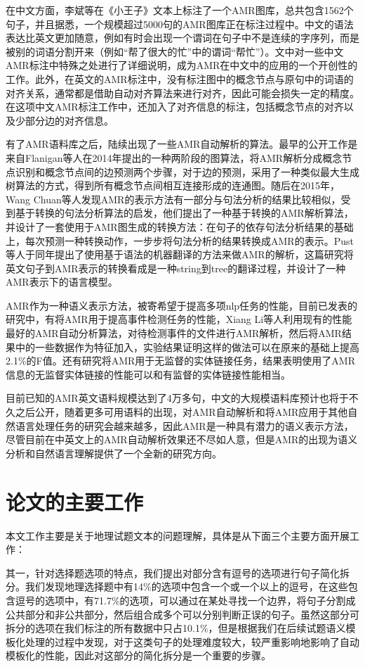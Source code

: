 \documentclass[master, winfont]{njuthesis}
\begin{document}
在中文方面，李斌等\cite{Li2016Annotating}在《小王子》文本上标注了一个AMR图库，总共包含1562个句子，并且据悉，一个规模超过5000句的AMR图库正在标注过程中。中文的语法表达比英文更加随意，例如有时会出现一个谓词在句子中不是连续的字序列，而是被别的词语分割开来（例如“帮了很大的忙”中的谓词“帮忙”）。文中对一些中文AMR标注中特殊之处进行了详细说明，成为AMR在中文中的应用的一个开创性的工作。此外，在英文的AMR标注中，没有标注图中的概念节点与原句中的词语的对齐关系，通常都是借助自动对齐算法来进行对齐，因此可能会损失一定的精度。在这项中文AMR标注工作中，还加入了对齐信息的标注，包括概念节点的对齐以及少部分边的对齐信息。

有了AMR语料库之后，陆续出现了一些AMR自动解析的算法。最早的公开工作是来自Flanigan等人\cite{Flanigan2014}在2014年提出的一种两阶段的图算法，将AMR解析分成概念节点识别和概念节点间的边预测两个步骤，对于边的预测，采用了一种类似最大生成树算法的方式，得到所有概念节点间相互连接形成的连通图。随后在2015年，Wang Chuan\cite{Wang2015}等人发现AMR的表示方法有一部分与句法分析的结果比较相似，受到基于转换的句法分析算法的启发，他们提出了一种基于转换的AMR解析算法，并设计了一套使用于AMR图生成的转换方法：在句子的依存句法分析结果的基础上，每次预测一种转换动作，一步步将句法分析的结果转换成AMR的表示。Pust等人\cite{Pust2015}于同年提出了使用基于语法的机器翻译的方法来做AMR的解析，这篇研究将英文句子到AMR表示的转换看成是一种string到tree的翻译过程，并设计了一种AMR表示下的语言模型。

AMR作为一种语义表示方法，被寄希望于提高多项nlp任务的性能，目前已发表的研究中，有将AMR用于提高事件检测任务的性能\cite{kai2015improving}，Xiang Li等人利用现有的性能最好的AMR自动分析算法，对待检测事件的文件进行AMR解析，然后将AMR结果中的一些数据作为特征加入，实验结果证明这样的做法可以在原来的基础上提高2.1\%的F值。还有研究将AMR用于无监督的实体链接任务\cite{Pan2015}，结果表明使用了AMR信息的无监督实体链接的性能可以和有监督的实体链接性能相当。

目前已知的AMR英文语料规模达到了4万多句，中文的大规模语料库预计也将于不久之后公开，随着更多可用语料的出现，对AMR自动解析和将AMR应用于其他自然语言处理任务的研究会越来越多，因此AMR是一种具有潜力的语义表示方法，尽管目前在中英文上的AMR自动解析效果还不尽如人意，但是AMR的出现为语义分析和自然语言理解提供了一个全新的研究方向。

\section{论文的主要工作}
本文工作主要是关于地理试题文本的问题理解，具体是从下面三个主要方面开展工作：

其一，针对选择题选项的特点，我们提出对部分含有逗号的选项进行句子简化拆分。我们发现地理选择题中有14\%的选项中包含一个或一个以上的逗号，在这些包含逗号的选项中，有71.7\%的选项，可以通过在某处寻找一个边界，将句子分割成公共部分和非公共部分，然后组合成多个可以分别判断正误的句子。虽然这部分可拆分的选项在我们标注的所有数据中只占10.1\%，但是根据我们在后续试题语义模板化处理的过程中发现，对于这类句子的处理难度较大，较严重影响地影响了自动模板化的性能，因此对这部分的简化拆分是一个重要的步骤。
\end{document}
